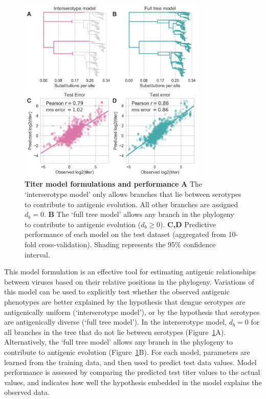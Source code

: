 \begin{figure}[ht!]
  \begin{centering}
    \includegraphics[width=0.8\textwidth]{./png/titer_model_performance.png}
        \caption[Titer model formulations and performance]{\textbf{Titer model formulations and performance }
        \textbf{A} The `interserotype model' only allows branches that lie between serotypes to contribute to antigenic evolution.
        All other branches are assigned $d_b = 0$.
        \textbf{B} The `full tree model' allows any branch in the phylogeny to contribute to antigenic evolution ($d_b \geq 0$).
        \textbf{C,D} Predictive performance of each model on the test dataset (aggregated from 10-fold cross-validation).
        Shading represents the 95\% confidence interval.
        }
         \label{titer_model_performance}
  \end{centering}
\end{figure}

This model formulation is an effective tool for estimating antigenic relationships between viruses based on their relative positions in the phylogeny.
Variations of this model can be used to explicitly test whether the observed antigenic phenotypes are better explained by the hypothesis that dengue serotypes are antigenically uniform (`interserotype model'), or by the hypothesis that serotypes are antigenically diverse (`full tree model').
In the interserotype model, $d_b = 0$ for all branches in the tree that do not lie between serotypes (Figure~\ref{titer_model_performance}A).
Alternatively, the `full tree model' allows any branch in the phylogeny to contribute to antigenic evolution (Figure~\ref{titer_model_performance}B).
For each model, parameters are learned from the training data, and then used to predict test data values.
Model performance is assessed by comparing the predicted test titer values to the actual values, and indicates how well the hypothesis embedded in the model explains the observed data.

